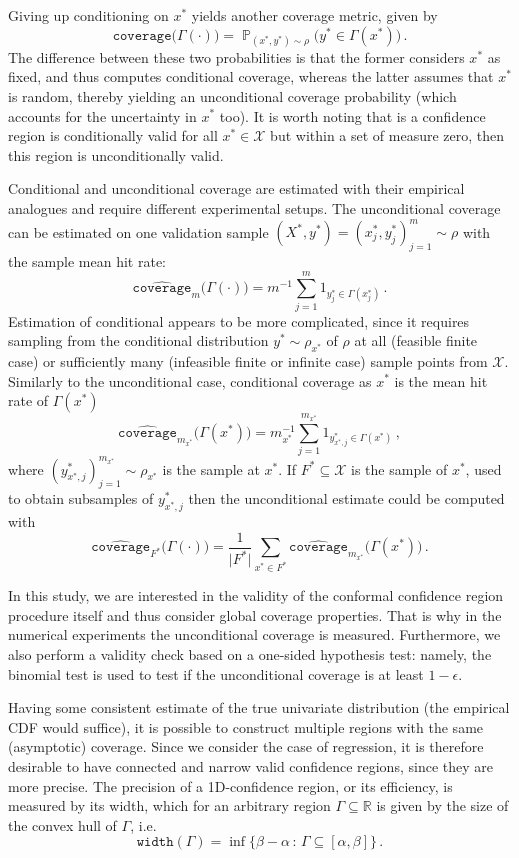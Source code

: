 \documentclass[a4paper,14pt]{article}
\newcommand{\pr}{\mathop{\mathbb{P}}\nolimits}
\newcommand{\Xcal}{\mathcal{X}}
\newcommand{\Real}{\mathbb{R}}
\begin{document}
Giving up conditioning on $x^*$ yields another coverage metric, given by
$$ \mathtt{coverage}\bigl(\Gamma(\cdot)\bigr)
  = \pr_{(x^*, y^*)\sim\rho}\bigl(y^* \in \Gamma(x^*)\bigr)
  \,. $$
The difference between these two probabilities is that the former considers $x^*$ as
fixed, and thus computes conditional coverage, whereas the latter assumes that $x^*$
is random, thereby yielding an unconditional coverage probability (which accounts for
the uncertainty in $x^*$ too). It is worth noting that is a confidence region is
conditionally valid for all $x^*\in \Xcal$ but within a set of measure zero, then
this region is unconditionally valid.

Conditional and unconditional coverage are estimated with their empirical analogues
and require different experimental setups. The unconditional coverage can be estimated
on one validation sample $(X^*, y^*)=(x^*_j, y^*_j)_{j=1}^m \sim \rho$ with the
sample mean hit rate:
$$ \widehat{\mathtt{coverage}}_m\bigl(\Gamma(\cdot)\bigr)
  = m^{-1} \sum_{j=1}^m 1_{y^*_j \in \Gamma(x^*_j)} \,. $$
Estimation of conditional appears to be more complicated, since it requires sampling
from the conditional distribution $y^*\sim \rho_{x^*}$ of $\rho$ at all (feasible
finite case) or sufficiently many (infeasible finite or infinite case) sample points
from $\Xcal$. Similarly to the unconditional case, conditional coverage as $x^*$ is
the mean hit rate of $\Gamma(x^*)$
$$ \widehat{\mathtt{coverage}}_{m_{x^*}}\bigl(\Gamma(x^*)\bigr)
  = m_{x^*}^{-1} \sum_{j=1}^{m_{x^*}} 1_{y^*_{x^*,j} \in \Gamma(x^*)} \,, $$
where $(y^*_{x^*,j})_{j=1}^{m_{x^*}}\sim \rho_{x^*}$ is the sample at $x^*$. If
$F^*\subseteq \Xcal$ is the sample of $x^*$, used to obtain subsamples of $y^*_{x^*, j}$
then the unconditional estimate could be computed with
$$ \widehat{\mathtt{coverage}}_{F^*}\bigl(\Gamma(\cdot)\bigr)
	= \frac{1}{\lvert F^*\rvert} \sum_{x^* \in F^*}
      \widehat{\mathtt{coverage}}_{m_{x^*}}\bigl(\Gamma(x^*)\bigr) \,. $$

In this study, we are interested in the validity of the conformal confidence region
procedure itself and thus consider global coverage properties. That is why in the
numerical experiments the unconditional coverage is measured. Furthermore, we also
perform a validity check based on a one-sided hypothesis test: namely, the binomial
test is used to test if the unconditional coverage is at least $1-\epsilon$.

Having some consistent estimate of the true univariate distribution (the empirical
CDF would suffice), it is possible to construct multiple regions with the same
(asymptotic) coverage. Since we consider the case of regression, it is therefore
desirable to have connected and narrow valid confidence regions, since they are
more precise. The precision of a 1D-confidence region, or its efficiency, is measured
by its width, which for an arbitrary region $\Gamma\subseteq \Real$ is given by
the size of the convex hull of $\Gamma$, i.e.
$$ \mathtt{width}(\Gamma)
  = \inf\{\beta-\alpha\,:\, \Gamma\subseteq [\alpha, \beta]\}
  \,. $$
\end{document}
